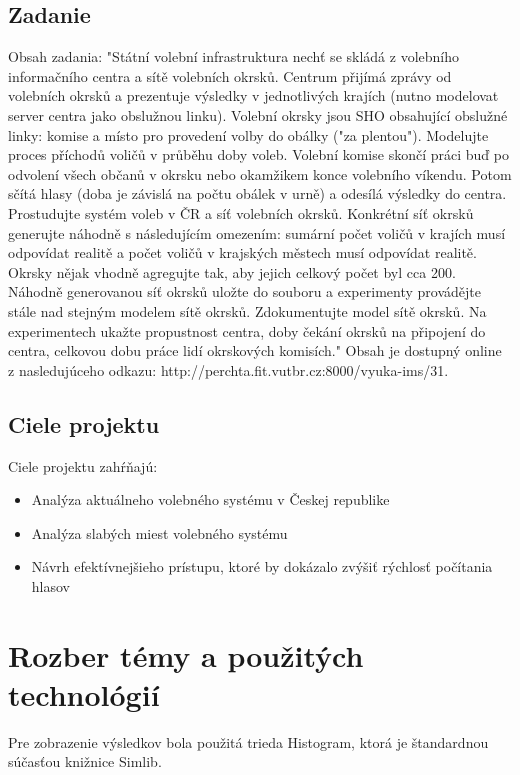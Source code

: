 \documentclass[12pt,a4paper,titlepage,final]{article}
\begin{document}
\subsection{Zadanie}
Obsah zadania: "Státní volební infrastruktura nechť se skládá z volebního informačního centra a sítě volebních okrsků. Centrum přijímá zprávy od volebních okrsků a prezentuje výsledky v jednotlivých krajích (nutno modelovat server centra jako obslužnou linku). Volební okrsky jsou SHO obsahující obslužné linky: komise a místo pro provedení volby do obálky ("za plentou"). Modelujte proces příchodů voličů v průběhu doby voleb. Volební komise skončí práci buď po odvolení všech občanů v okrsku nebo okamžikem konce volebního víkendu. Potom sčítá hlasy (doba je závislá na počtu obálek v urně) a odesílá výsledky do centra. Prostudujte systém voleb v ČR a síť volebních okrsků. Konkrétní síť okrsků generujte náhodně s následujícím omezením: sumární počet voličů v krajích musí odpovídat realitě a počet voličů v krajských městech musí odpovídat realitě. Okrsky nějak vhodně agregujte tak, aby jejich celkový počet byl cca 200. Náhodně generovanou síť okrsků uložte do souboru a experimenty provádějte stále nad stejným modelem sítě okrsků. Zdokumentujte model sítě okrsků. Na experimentech ukažte propustnost centra, doby čekání okrsků na připojení do centra, celkovou dobu práce lidí okrskových komisích."
Obsah je dostupný online z nasledujúceho odkazu: http://perchta.fit.vutbr.cz:8000/vyuka-ims/31.\cite{Prokop:Algoritmy}



\subsection{Ciele projektu}
Ciele projektu zahŕňajú:
\begin{itemize}
\item Analýza aktuálneho volebného systému v Českej republike
\item Analýza slabých miest volebného systému
\item Návrh efektívnejšieho prístupu, ktoré by dokázalo zvýšiť rýchlosť počítania hlasov
\end{itemize}


\section{Rozber témy a použitých technológií}

\indent


Pre zobrazenie výsledkov bola použitá trieda Histogram, ktorá je štandardnou súčasťou knižnice Simlib.
\end{document}
